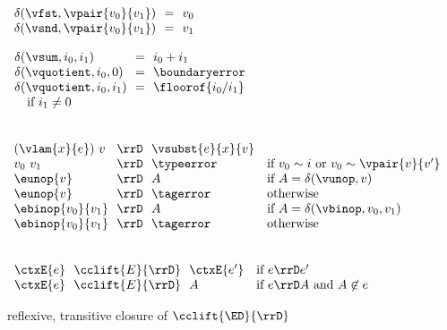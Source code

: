 \begin{flushleft}
\medskip
\begin{minipage}[t]{0.38\columnwidth}
$\begin{array}{l@{~~}c@{~~}l}
  \delta(\vfst, \vpair{v_0}{v_1}) & = & v_0
\\
  \delta(\vsnd, \vpair{v_0}{v_1}) & = & v_1
\end{array}$
\end{minipage}%
\begin{minipage}[t]{0.5\columnwidth}
$\begin{array}{l@{~~}c@{~~}l}
  \delta(\vsum, i_0, i_1) & = & i_0 + i_1
\\
  \delta(\vquotient, i_0, 0) & = & \boundaryerror
\\
  \delta(\vquotient, i_0, i_1) & = & \floorof{i_0 / i_1}
\\ \multicolumn{3}{l}{\mbox{\quad if $i_1 \neq 0$}}
\end{array}$
\end{minipage}


\medskip
{}\\
$\begin{array}{l@{~~}c@{~~}l l}
  (\vlam{x}{e})~v & \rrD & \vsubst{e}{x}{v} &
\\
  v_0~v_1 & \rrD & \typeerror & \mbox{if $v_0 \sim i$ or $v_0 \sim \vpair{v}{v'}$}
\\
  \eunop{v} & \rrD & A & \mbox{if $A = \delta(\vunop, v)$}
\\
  \eunop{v} & \rrD & \tagerror & \mbox{otherwise}
\\
  \ebinop{v_0}{v_1} & \rrD & A & \mbox{if $A = \delta(\vbinop, v_0, v_1)$}
\\
  \ebinop{v_0}{v_1} & \rrD & \tagerror & \mbox{otherwise}
\end{array}$

\medskip
{}\\
$\begin{array}{l@{~~}c@{~~}l l}
\ctxE{e} & \cclift{E}{\rrD} & \ctxE{e'} & \mbox{if $e \rrD e'$}
\\
\ctxE{e} & \cclift{E}{\rrD} & A         & \mbox{if $e \rrD A$ and $A \not\in e$}
\end{array}$

\smallskip
{} reflexive, transitive closure of $\cclift{\ED}{\rrD}$

\end{flushleft}
